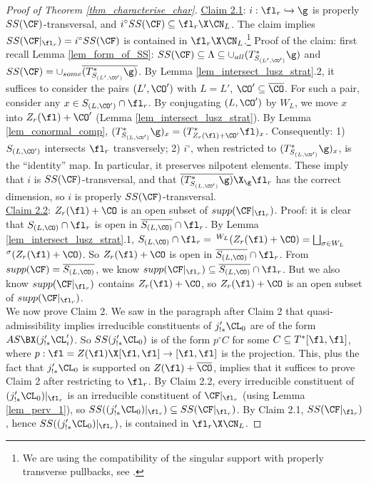 \begin{proof}[Proof of Theorem \ref{thm_characterise_char}]
\underline{Claim 2.1}: $i: \fl_r\hookrightarrow \g$ is properly $SS(\CF)$-transversal, and $i^\circ SS(\CF)\subseteq \fl_r\X\CN_L$. The claim implies $SS(\CF|_{\fl_r})=i^\circ SS(\CF)$ is contained in $\fl_r\X\CN_L$.\footnote{We are using the compatibility of the singular support with properly transverse pullbacks, see \cites[]{saito_characteristic_2017}[]{barrett_singular_2023}.} Proof of the claim: first recall Lemma \ref{lem_form_of_SS}: $SS(\CF)\subseteq \Lambda \subseteq \cup_{all} (T^*_{S_{(L',\CO')}}\g)$ and $SS(\CF)=\cup_{some} \overline{(T^*_{S_{(L',\CO')}}\g)}$. By Lemma \ref{lem_intersect_lusz_strat}.2, it suffices to consider the pairs $(L',\CO')$ with $L=L'$, $\CO'\subseteq \overline{\CO}$. For such a pair, consider any $x\in S_{(L,\CO')}\cap \fl_r$. By conjugating $(L,\CO')$ by $W_L$, we move $x$ into $Z_r(\fl)+\CO'$ (Lemma \ref{lem_intersect_lusz_strat}). By Lemma \ref{lem_conormal_comp}, $(T^*_{S_{(L,\CO')}}\g)_x=(T^*_{Z_r(\fl)+\CO'}\fl)_x$. Consequently: 1) $S_{(L,\CO')}$ intersects $\fl_r$ transversely; 2) $i^\circ$, when restricted to $(T^*_{S_{(L,\CO')}}\g)_x$, is the “identity” map. In particular, it preserves nilpotent elements. These imply that $i$ is $SS(\CF)$-transversal, and that $\overline{(T^*_{S_{(L,\CO')}}\g)}\X_\g \fl_r$ has the correct dimension, so $i$ is properly $SS(\CF)$-transversal.\\

\underline{Claim 2.2}: $Z_r(\fl)+\CO$ is an open subset of $supp(\CF|_{\fl_r})$. Proof: it is clear that $S_{(L,\CO)}\cap \fl_r$ is open in $\overline{S_{(L,\CO)}}\cap \fl_r$. By Lemma \ref{lem_intersect_lusz_strat}.1, $S_{(L,\CO)}\cap \fl_r=$ $^{W_L}(Z_r(\fl)+\CO)=\bigsqcup_{\sigma\in W_L}$ $^\sigma(Z_r(\fl)+\CO)$.  So $Z_r(\fl)+\CO$ is open in $\overline{S_{(L,\CO)}}\cap \fl_r$. From $supp(\CF)=\overline{S_{(L,\CO)}}$, we know $supp(\CF|_{\fl_r})\subseteq \overline{S_{(L,\CO)}}\cap \fl_r$. But we also know $supp(\CF|_{\fl_r})$ contains $Z_r(\fl)+\CO$, so $Z_r(\fl)+\CO$ is an open subset of $supp(\CF|_{\fl_r})$.\\

We now prove Claim 2. We saw in the paragraph after Claim 2 that quasi-admissibility implies irreducible constituents of $j'_{!*}\CL_0$ are of the form $AS\BX(j'_{!*}\CL_i')$. So $SS(j'_{!*}\CL_0)$ is of the form $p^\circ C$ for some $C\subseteq T^*[\fl,\fl]$, where $p: \fl=Z(\fl)\X[\fl,\fl]\rightarrow [\fl,\fl]$ is the projection. This, plus the fact that $j'_{!*}\CL_0$ is supported on $Z(\fl)+\overline{\CO}$, implies that it suffices to prove Claim 2 after restricting to $\fl_r$. By Claim 2.2, every irreducible constituent of $(j'_{!*}\CL_0)|_{\fl_r}$ is an irreducible constituent of $\CF|_{\fl_r}$ (using Lemma \ref{lem_perv_1}), so $SS((j'_{!*}\CL_0)|_{\fl_r})\subseteq SS(\CF|_{\fl_r})$. By Claim 2.1, $SS(\CF|_{\fl_r})$, hence $SS((j'_{!*}\CL_0)|_{\fl_r})$, is contained in $\fl_r\X\CN_L$.

\end{proof}



